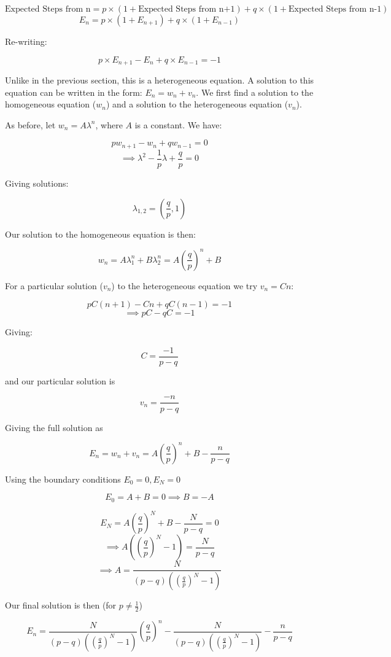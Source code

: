 \documentclass{article}
\begin{document}
$$\text{Expected Steps from n} = p \times (1 + \text{Expected Steps from n+1}) + q \times (1 + \text{Expected Steps from n-1}) $$
$$E_n = p \times (1 + E_{n+1}) + q \times (1 + E_{n-1}) $$

Re-writing:

$$p \times E_{n+1} - E_n + q \times E_{n-1} = -1$$

Unlike in the previous section, this is a heterogeneous equation. A solution to this equation can be written in the form: $E_n = w_n + v_n$. We first find a solution to the homogeneous equation ($w_n$) and a solution to the heterogeneous equation ($v_n$). 

As before, let $w_n = A \lambda^n$, where $A$ is a constant. We have:

$$p w_{n+1} - w_n + q w_{n-1} = 0$$
$$\implies \lambda^2 - \frac{1}{p} \lambda + \frac{q}{p} = 0$$

Giving solutions:

$$\lambda_{1,2} = (\frac{q}{p}, 1)$$

Our solution to the homogeneous equation is then:

$$w_n = A \lambda_1^n + B \lambda_2^n = A (\frac{q}{p})^n + B$$

For a particular solution ($v_n$) to the heterogeneous equation we try $v_n = Cn$:

$$p C(n+1) - Cn + q C(n-1) = -1 $$
$$\implies pC - qC = -1$$

Giving:

$$C = \frac{-1}{p-q}$$

and our particular solution is 

$$v_n = \frac{-n}{p-q}$$

Giving the full solution as

\begin{equation}
    E_n = w_n + v_n = A (\frac{q}{p})^n + B - \frac{n}{p-q} 
\end{equation}

Using the boundary conditions $E_0 = 0, E_N = 0$

$$E_0 = A + B = 0 \implies B = -A$$

$$E_N = A (\frac{q}{p})^N + B - \frac{N}{p-q} = 0$$
$$\implies A((\frac{q}{p})^N - 1) = \frac{N}{p-q}$$
$$\implies A = \frac{N}{(p-q)((\frac{q}{p})^N - 1)}$$

Our final solution is then (for $p \neq \frac{1}{2}$)

\begin{equation}
    E_n = \frac{N}{(p-q)((\frac{q}{p})^N - 1)} (\frac{q}{p})^n - \frac{N}{(p-q)((\frac{q}{p})^N - 1)} - \frac{n}{p-q} 
\end{equation}
\end{document}
